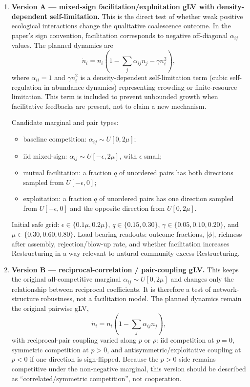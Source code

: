 \documentclass[11pt]{article}
\begin{document}
\begin{enumerate}[itemsep=5pt]
    \item \textbf{Version A --- mixed-sign facilitation/exploitation gLV with density-dependent self-limitation.}
    This is the direct test of whether weak positive ecological interactions change the qualitative coalescence outcome. In the paper's sign convention, facilitation corresponds to negative off-diagonal $\alpha_{ij}$ values. The planned dynamics are
    \begin{equation*}
        \dot n_i
        =
        n_i
        \left(
            1
            - \sum_j \alpha_{ij} n_j
            - \gamma n_i^2
        \right),
    \end{equation*}
    where $\alpha_{ii}=1$ and $\gamma n_i^2$ is a density-dependent self-limitation term (cubic self-regulation in abundance dynamics) representing crowding or finite-resource limitation. This term is included to prevent unbounded growth when facilitative feedbacks are present, not to claim a new mechanism.

    Candidate marginal and pair types:
    \begin{itemize}[itemsep=2pt]
        \item baseline competition: $\alpha_{ij}\sim U[0,2\mu]$;
        \item iid mixed-sign: $\alpha_{ij}\sim U[-\epsilon,2\mu]$, with $\epsilon$ small;
        \item mutual facilitation: a fraction $q$ of unordered pairs has both directions sampled from $U[-\epsilon,0]$;
        \item exploitation: a fraction $q$ of unordered pairs has one direction sampled from $U[-\epsilon,0]$ and the opposite direction from $U[0,2\mu]$.
    \end{itemize}
    Initial safe grid: $\epsilon \in \{0.1\mu,0.2\mu\}$, $q \in \{0.15,0.30\}$, $\gamma \in \{0.05,0.10,0.20\}$, and $\mu \in \{0.30,0.60,0.80\}$. Load-bearing readouts: outcome fractions, $|\phi|$, richness after assembly, rejection/blow-up rate, and whether facilitation increases Restructuring in a way relevant to natural-community excess Restructuring.

    \item \textbf{Version B --- reciprocal-correlation / pair-coupling gLV.}
    This keeps the original all-competitive marginal $\alpha_{ij}\sim U[0,2\mu]$ and changes only the relationship between reciprocal coefficients. It is therefore a test of network-structure robustness, not a facilitation model. The planned dynamics remain the original pairwise gLV,
    \begin{equation*}
        \dot n_i
        =
        n_i
        \left(
            1
            - \sum_j \alpha_{ij} n_j
        \right),
    \end{equation*}
    with reciprocal-pair coupling varied along $p$ or $\rho$: iid competition at $p=0$, symmetric competition at $p>0$, and antisymmetric/exploitative coupling at $p<0$ if one direction is sign-flipped. Because the $p>0$ side remains competitive under the non-negative marginal, this version should be described as ``correlated/symmetric competition'', not cooperation.


\end{enumerate}
\end{document}
